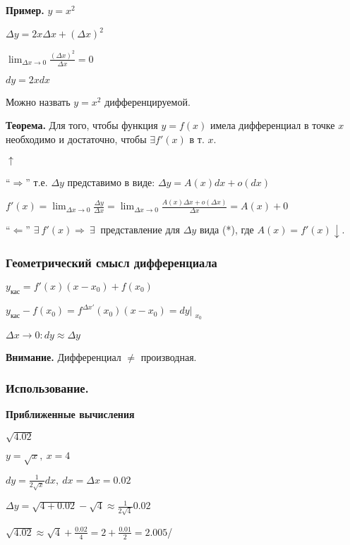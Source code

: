 \documentclass{article}
\begin{document}
    \textbf{Пример.} \( y = x^2 \)

    \( \Delta y = 2x\Delta x + (\Delta x)^2 \)

    \( \lim_{\Delta x \to 0} \frac{(\Delta x)^2}{\Delta x} = 0 \)

    \( dy = 2xdx \)
    
    Можно назвать \( y = x^2 \) дифференцируемой.

    \textbf{Теорема.} Для того, чтобы функция \( y = f(x) \) имела дифференциал в точке \(x\) необходимо и достаточно, чтобы \(\exists f'(x)\) в т. \(x\).

    \(\uparrow\)

    ``\( \Rightarrow \)'' т.е. \( \Delta y \) представимо в виде: \( \Delta y = A(x)dx + o(dx) \)

    \(f'(x) = \lim_{\Delta x \to 0}\frac{\Delta y}{\Delta x} = \lim_{\Delta x \to 0}\frac{A(x)\Delta x + o(\Delta x)}{\Delta x} = A(x) + 0 \)

    ``\( \Leftarrow \)'' \(\exists\ f'(x) \Rightarrow\ \exists\ \) представление для \(\Delta y\) вида (*), где \(A(x) = f'(x) \downarrow\).

    \subsubsection{Геометрический смысл дифференциала} %

    \( y_{\textrm{кас}} = f'(x)(x - x_0) + f(x_0) \)

    \( y_{\textrm{кас}} - f(x_0) = f^{\Delta x'}(x_0)(x - x_0) = dy\Bigr|_{\substack{x_0}} \)


    \( \Delta x \to 0: dy \approx \Delta y \)

    \textbf{Внимание.} Дифференциал \(\neq\) производная.

    \subsubsection{Использование.}

    \textbf{Приближенные вычисления}

    \( \sqrt{4.02} \)

    \( y = \sqrt{x},\ x = 4\)
    
    \( dy = \frac{1}{2\sqrt{x}}dx,\ dx = \Delta x = 0.02 \)

    \( \Delta y = \sqrt{4 + 0.02} - \sqrt{4} \approx \frac{1}{2\sqrt{4}}0.02 \)

    \( \sqrt{4.02} \approx \sqrt{4} + \frac{0.02}{4} = 2 + \frac{0.01}{2} = 2.005 \)/
\end{document}
